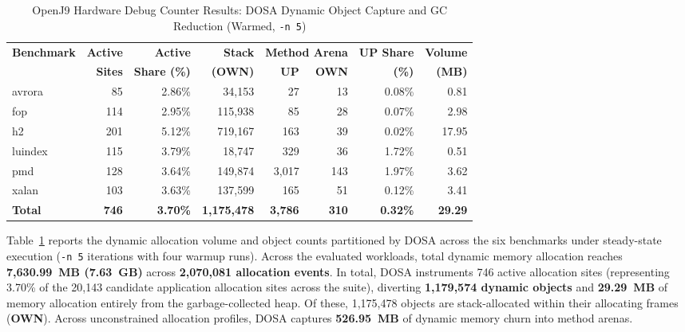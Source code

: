 \documentclass[12pt,a4paper]{article}
\newcommand{\OWN}{\textbf{OWN}}
\newcommand{\UP}{\textbf{UP}}
\begin{document}
\begin{table}[htbp]
\centering
\caption{OpenJ9 Hardware Debug Counter Results: DOSA Dynamic Object Capture and GC Reduction (Warmed, \texttt{-n 5})}
\label{tab:hw-results}
\small
\setlength{\tabcolsep}{4.5pt}
\begin{tabular}{lrrrrrrr}
\toprule
\textbf{Benchmark} & \textbf{Active} & \textbf{Active} & \textbf{Stack} & \multicolumn{2}{c}{\textbf{Method Arena}} & \textbf{\UP{} Share} & \textbf{Volume} \\
\cmidrule(lr){5-6}
& \textbf{Sites} & \textbf{Share (\%)} & \textbf{(\OWN{})} & \textbf{\UP{}} & \textbf{\OWN{}} & \textbf{(\%)} & \textbf{(MB)} \\
\midrule
avrora  & 85  & 2.86\% & 34{,}153    & 27        & 13      & 0.08\% & 0.81  \\
fop     & 114 & 2.95\% & 115{,}938   & 85        & 28      & 0.07\% & 2.98  \\
h2      & 201 & 5.12\% & 719{,}167   & 163       & 39      & 0.02\% & 17.95 \\
luindex & 115 & 3.79\% & 18{,}747    & 329       & 36      & 1.72\% & 0.51  \\
pmd     & 128 & 3.64\% & 149{,}874   & 3{,}017   & 143     & 1.97\% & 3.62  \\
xalan   & 103 & 3.63\% & 137{,}599   & 165       & 51      & 0.12\% & 3.41  \\
\midrule
\textbf{Total} & \textbf{746} & \textbf{3.70\%} & \textbf{1{,}175{,}478} & \textbf{3{,}786} & \textbf{310} & \textbf{0.32\%} & \textbf{29.29} \\
\bottomrule
\end{tabular}
\end{table}

Table~\ref{tab:hw-results} reports the dynamic allocation volume and object counts partitioned by DOSA across the six benchmarks under steady-state execution (\texttt{-n 5} iterations with four warmup runs). Across the evaluated workloads, total dynamic memory allocation reaches \textbf{7{,}630.99~MB (7.63~GB)} across \textbf{2{,}070{,}081 allocation events}. In total, DOSA instruments 746 active allocation sites (representing 3.70\% of the 20{,}143 candidate application allocation sites across the suite), diverting \textbf{1{,}179{,}574 dynamic objects} and \textbf{29.29~MB} of memory allocation entirely from the garbage-collected heap. Of these, 1{,}175{,}478 objects are stack-allocated within their allocating frames (\OWN{}). Across unconstrained allocation profiles, DOSA captures \textbf{526.95~MB} of dynamic memory churn into method arenas. 
\end{document}
